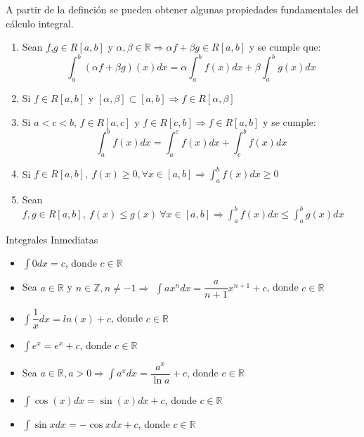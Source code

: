 \documentclass[xcolor=table, t]{beamer}
\begin{document}
	\begin{frame}
		A partir de la definción se pueden obtener algunas propiedades fundamentales del cálculo integral.
		\begin{block}{}
			\begin{enumerate}[<+->]
				\item Sean $f$,$g\in R[a,b]$ y $\alpha,\beta\in\mathbb{R}\Rightarrow \alpha f+\beta g\in R[a,b]$ y se cumple que:
				$$\int_a^b(\alpha f+\beta g)(x)dx=\alpha\int_a^b f(x)dx+\beta\int_a^bg(x)dx$$
				\item Si $f\in R[a,b]$ y $[\alpha,\beta]\subset[a,b]\Rightarrow f\in R[\alpha,\beta]$
				\item Si $a<c<b$, $f\in R[a,c]$ y $f\in R[c,b]\Rightarrow f\in R[a,b]$ y se cumple:
				$$\int_a^b f(x)dx=\int_a^cf(x)dx+\int_c^bf(x)dx$$
				\item Si $\displaystyle f\in R[a,b],\ f(x)\geq 0, \forall x\in[a,b]\Rightarrow \int_a^bf(x)dx\geq0$
				\item Sean $\displaystyle f,g\in R[a,b],\ f(x)\leq g(x)\ \forall x\in[a,b]\Rightarrow \int_a^bf(x)dx\leq\int_a^bg(x)dx$
			\end{enumerate}
		\end{block}
	\end{frame}
	\begin{frame}
		\begin{block}{Integrales Inmediatas}
			\begin{itemize}[<+->]
				\item $\displaystyle \int 0dx=c$, donde $c\in\mathbb{R}$
				\item Sea $a\in\mathbb{R}$ y $n\in\mathbb{Z}, n\neq-1\Rightarrow$ $\displaystyle \int ax^ndx=\dfrac{a}{n+1}x^{n+1}+c$, donde $c\in\mathbb{R}$
				\item $\displaystyle\int\dfrac{1}{x}dx=ln(x)+c$, donde $c\in\mathbb{R}$
				\item $\displaystyle\int e^x=e^x+c$, donde $c\in\mathbb{R}$
				\item Sea $\displaystyle a\in\mathbb{R}, a>0\Rightarrow \int a^xdx=\dfrac{a^x}{\ln a}+c$, donde $c\in\mathbb{R}$
				\item $\displaystyle \int\cos(x)dx=\sin(x)dx+c$, donde $c\in\mathbb{R}$
				\item $\displaystyle \int\sin xdx=-\cos xdx+c$, donde $c\in\mathbb{R}$
			\end{itemize}
		\end{block}
	\end{frame}
\end{document}
